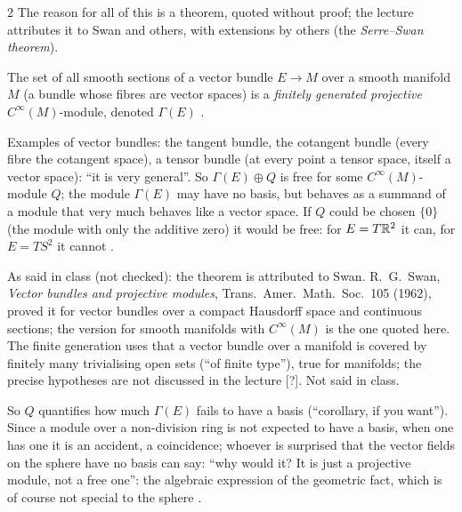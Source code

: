 \begin{paracol}{2}
The reason for all of this is a theorem, quoted without proof; the lecture attributes it to Swan and others, with extensions by others (the \emph{Serre--Swan theorem}).
\begin{theorem}\label{thm:rm-serre-swan}
The set of all smooth sections of a vector bundle $E\to M$ over a smooth manifold $M$ (a bundle whose fibres are vector spaces) is a \emph{finitely generated projective} $C^\infty(M)$-module, denoted $\Gamma(E)$      .
\end{theorem}
Examples of vector bundles: the tangent bundle, the cotangent bundle (every fibre the cotangent space), a tensor bundle (at every point a tensor space, itself a vector space): ``it is very general''. So $\Gamma(E)\oplus Q$ is free for some $C^\infty(M)$-module $Q$; the module $\Gamma(E)$ may have no basis, but behaves as a summand of a module that very much behaves like a vector space.
If $Q$ could be chosen $\{0\}$ (the module with only the additive zero) it would be free: for $E=T\mathbb{R}^2$ it can, for $E=TS^2$ it cannot   .
\begin{coursenote}
As said in class (not checked): the theorem is attributed to Swan. R.~G.~Swan, \emph{Vector bundles and projective modules}, Trans.\ Amer.\ Math.\ Soc.\ 105 (1962), proved it for vector bundles over a compact Hausdorff space and continuous sections; the version for smooth manifolds with $C^\infty(M)$ is the one quoted here. The
finite generation uses that a vector bundle over a manifold is covered by finitely many trivialising open sets (``of finite type''), true for manifolds; the precise hypotheses are not discussed in the lecture [?]. Not said in class.
\end{coursenote}
So $Q$ quantifies how much $\Gamma(E)$ fails to have a basis (``corollary, if you want''). Since a module over a non-division ring is not expected to have a basis, when one has one it is an accident, a coincidence; whoever is surprised that the vector fields on the sphere have no basis can say: ``why would it? It is just a projective module, not a free one'': the algebraic expression of the geometric fact,
which is of course not special to the sphere     .


\end{paracol}
